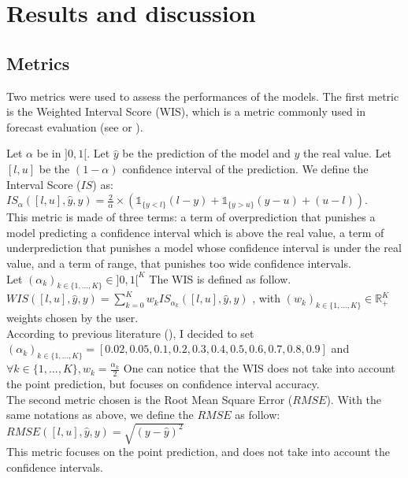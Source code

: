 \section{Results and discussion}


\subsection*{Metrics}
\label{sec:metrics}
Two metrics were used to assess the performances of the models. 
The first metric is the Weighted Interval Score (WIS), which is a metric commonly used in forecast evaluation (see \cite{cramer2022evaluation} or \cite{paireau2022ensemble}). 

Let $\alpha$ be in $]0, 1[$. Let $\hat{y}$ be the prediction of the model and $y$ the real value.
Let $[l, u]$ be the $(1-\alpha)$ confidence interval of the prediction.
We define the Interval Score ($IS$) as: \\
$IS_\alpha([l, u], \hat{y}, y) = \frac{2}{\alpha} \times (\mathbb{1}_{\{y<l\}} (l-y) + \mathbb{1}_{\{y>u\}} (y-u) + (u-l))$. \\
This metric is made of three terms: a term of overprediction that punishes a model predicting a confidence interval which is above the real value, a term of underprediction that punishes a model whose confidence interval is under the real value, and a term of range, that punishes too wide confidence intervals. \\
Let $(\alpha_k)_{k \in \{1, \dots , K\}} \in ] 0 , 1 [ ^K $
The WIS is defined as follow. \\

$WIS([l, u], \hat{y}, y) = \sum_{k=0}^{K} w_k IS_{\alpha_k}([l, u], \hat{y}, y) $ , with $(w_k)_{k \in \{1, ... , K\}} \in \mathbb{R}_+ ^K $ weights chosen by the user. \\

According to previous literature (\cite{cramer2022evaluation}), I decided to set \\
$(\alpha_k)_{k \in \{1, ... , K\}} = [0.02, 0.05, 0.1, 0.2, 0.3, 0.4, 0.5, 0.6, 0.7, 0.8, 0.9]$ and $ \forall k \in  \{1, ... , K\}, w_k = \frac{\alpha_k}{2}$
One can notice that the WIS does not take into account the point prediction, but focuses on confidence interval accuracy. \\

The second metric chosen is the Root Mean Square Error ($RMSE$). 
With the same notations as above, we define the $RMSE$ as follow: \\
$RMSE([l, u], \hat{y}, y) = \sqrt{(y-\hat{y})^2}$\\
This metric focuses on the point prediction, and does not take into account the confidence intervals. 


